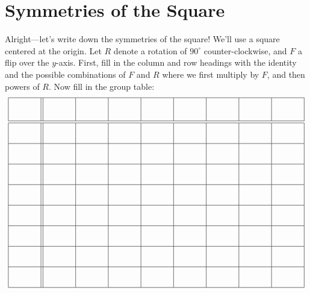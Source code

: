 \newpage
\section{Symmetries of the Square}

Alright---let's write down the symmetries of the square!  
\vskip 0.1in
\noindent We'll use a square centered at the origin.  Let $R$ denote a rotation of $90^\circ$ counter-clockwise, and $F$ a flip over the $y$-axis.  First, fill in the column and row headings with the identity and the possible combinations of $F$ and $R$ where we first multiply by $F$, and then powers of $R$.  Now fill in the group table:
\[
{\renewcommand{\arraystretch}{2}
\begin{array}{|c||c|c|c|c|c|c|c|c|}
    \hline
 \rule[7mm]{10mm}{0mm} & \rule[7mm]{10mm}{0mm} & \rule[7mm]{10mm}{0mm} &\rule[7mm]{10mm}{0mm} & \rule[7mm]{10mm}{0mm} & \rule[7mm]{10mm}{0mm} & \rule[7mm]{10mm}{0mm} & \rule[7mm]{10mm}{0mm} & \rule[7mm]{10mm}{0mm}\\ 
    \hline\hline
        &       &       &       &       &       &      & & \\
    \hline
        &       &       &       &       &       &      & & \\
    \hline
        &       &       &       &       &       &      & & \\
    \hline
        &       &       &       &       &       &      & & \\
    \hline
        &       &       &       &       &       &      & & \\
    \hline
        &       &       &       &       &       &      & & \\
    \hline
        &       &       &       &       &       &      & & \\
    \hline
        &       &       &       &       &       &      & & \\
    \hline
\end{array}}
\]




